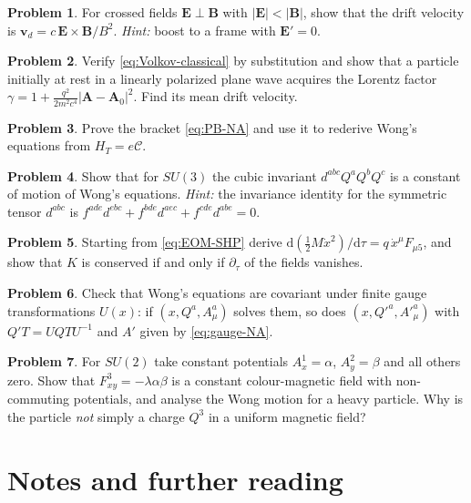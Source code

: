\documentclass[11pt,a4paper]{book}
\numberwithin{equation}{section}
\newcommand{\dd}{\mathrm{d}}
\newcommand{\Cc}{\mathcal{C}}          %
\newcommand{\bv}{\mathbf{v}}
\newcommand{\bE}{\mathbf{E}}
\newcommand{\bB}{\mathbf{B}}
\theoremstyle{definition}
\newtheorem{problem}{Problem}[chapter]
\theoremstyle{remark}
\begin{document}
\begin{problem}
For crossed fields $\bE\perp\bB$ with $|\bE|<|\bB|$, show that the drift
velocity is $\bv_d=c\,\bE\times\bB/B^2$.  \emph{Hint:} boost to a frame with
$\bE'=0$.
\end{problem}

\begin{problem}
Verify \eqref{eq:Volkov-classical} by substitution and show that a particle
initially at rest in a linearly polarized plane wave acquires the
Lorentz factor $\gamma=1+\tfrac{q^2}{2m^2c^4}|\mathbf A-\mathbf A_0|^2$.
Find its mean drift velocity.
\end{problem}

\begin{problem}
Prove the bracket \eqref{eq:PB-NA} and use it to rederive Wong's equations
from $H_T=e\Cc$.
\end{problem}

\begin{problem}
Show that for $SU(3)$ the cubic invariant $d^{abc}Q^aQ^bQ^c$ is a constant of
motion of Wong's equations.  \emph{Hint:} the invariance identity for the
symmetric tensor $d^{abc}$ is $f^{ade}d^{ebc}+f^{bde}d^{aec}+f^{cde}d^{abe}=0$.
\end{problem}

\begin{problem}
Starting from \eqref{eq:EOM-SHP} derive $\dd(\tfrac12M\dot x^2)/\dd\tau=q\,\dot x^\mu F_{\mu5}$,
and show that $K$ is conserved if and only if $\partial_\tau$ of the
fields vanishes.
\end{problem}

\begin{problem}
Check that Wong's equations are covariant under finite gauge
transformations $U(x)$: if $(x,Q^a,A^a_\mu)$ solves them, so does
$(x,Q'^a,A'^a_\mu)$ with $Q'T=UQTU^{-1}$ and $A'$ given by \eqref{eq:gauge-NA}.
\end{problem}

\begin{problem}\label{prob:const}
For $SU(2)$ take constant potentials $A^1_x=\alpha$, $A^2_y=\beta$ and all
others zero.  Show that $F^3_{xy}=-\lambda\alpha\beta$ is a constant
colour-magnetic field with non-commuting potentials, and analyse the Wong
motion for a heavy particle.  Why is the particle \emph{not} simply a charge
$Q^3$ in a uniform magnetic field?
\end{problem}

\section*{Notes and further reading}
\end{document}
